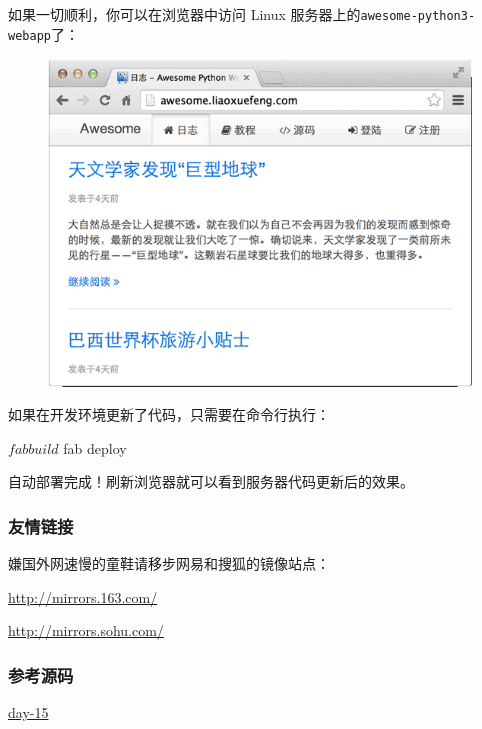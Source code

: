 如果一切顺利，你可以在浏览器中访问 Linux
服务器上的\texttt{awesome-python3-webapp}了：

 
 \begin{figure}[htp]
	\centering
	\includegraphics[width=0.6\linewidth]{fig/956196693474432.png}
\end{figure}


如果在开发环境更新了代码，只需要在命令行执行：

\begin{pythoncode}
$ fab build
$ fab deploy
\end{pythoncode}

自动部署完成！刷新浏览器就可以看到服务器代码更新后的效果。

\hypertarget{ux53cbux60c5ux94feux63a5}{%
\subsubsection{友情链接}\label{ux53cbux60c5ux94feux63a5}}

嫌国外网速慢的童鞋请移步网易和搜狐的镜像站点：

\url{http://mirrors.163.com/}

\url{http://mirrors.sohu.com/}

\hypertarget{ux53c2ux8003ux6e90ux7801}{%
\subsubsection{参考源码}\label{ux53c2ux8003ux6e90ux7801}}

\href{https://github.com/michaelliao/awesome-python3-webapp/tree/day-15}{day-15}

